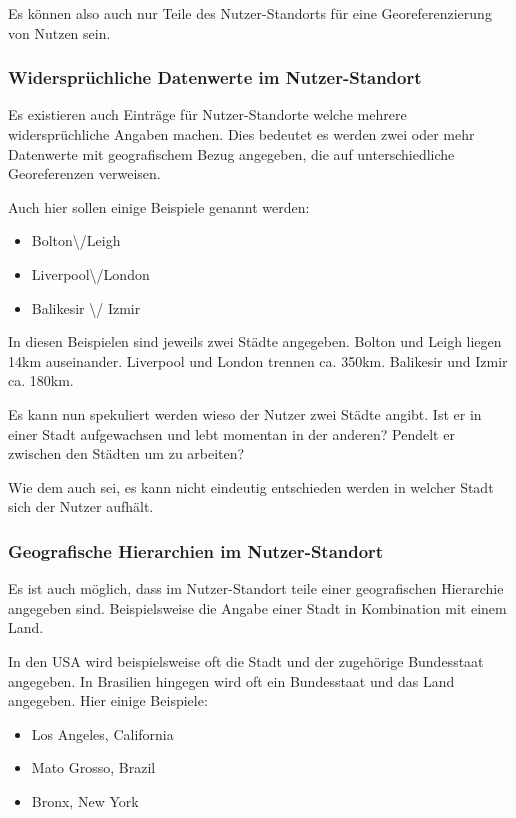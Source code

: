				Es können also auch nur Teile des Nutzer-Standorts für eine Georeferenzierung von Nutzen sein.

			\subsubsection*{Widersprüchliche Datenwerte im Nutzer-Standort} \label{subsec:wiederspruechlicheBezuege} 

				Es existieren auch Einträge für Nutzer-Standorte welche mehrere widersprüchliche Angaben machen.
				Dies bedeutet es werden zwei oder mehr Datenwerte mit geografischem Bezug angegeben, die auf unterschiedliche Georeferenzen verweisen.

				Auch hier sollen einige Beispiele genannt werden:

				\begin{itemize}
					\item Bolton\textbackslash/Leigh
					\item Liverpool\textbackslash/London
					\item  Balikesir \textbackslash/ Izmir	
				\end{itemize}							
					
				In diesen Beispielen sind jeweils zwei Städte angegeben.
				Bolton und Leigh liegen 14km auseinander.
				Liverpool und London trennen ca. 350km.
				Balikesir und Izmir ca. 180km.

				Es kann nun spekuliert werden wieso der Nutzer zwei Städte angibt.
				Ist er in einer Stadt aufgewachsen und lebt momentan in der anderen?
				Pendelt er zwischen den Städten um zu arbeiten?

				Wie dem auch sei, es kann nicht eindeutig entschieden werden in welcher Stadt sich der Nutzer aufhält.

			\subsubsection*{Geografische Hierarchien im Nutzer-Standort}

				Es ist auch möglich, dass im Nutzer-Standort teile einer geografischen Hierarchie angegeben sind.
				Beispielsweise die Angabe einer Stadt in Kombination mit einem Land.
				
				In den USA wird beispielsweise oft die Stadt und der zugehörige Bundesstaat angegeben.
				In Brasilien hingegen wird oft ein Bundesstaat und das Land angegeben.
				Hier einige Beispiele:

				\begin{itemize}
					\item Los Angeles, California
					\item Mato Grosso, Brazil
					\item Bronx, New York	
				\end{itemize}		

